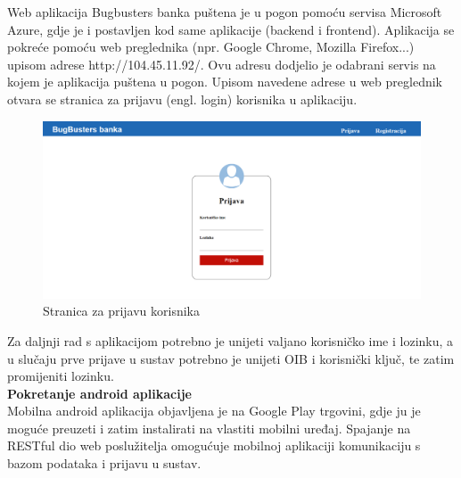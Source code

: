 			
			Web aplikacija Bugbusters banka puštena je u pogon pomoću servisa Microsoft Azure, gdje je i postavljen kod same aplikacije (backend i frontend). Aplikacija se pokreće pomoću web preglednika (npr. Google Chrome, Mozilla Firefox...) upisom adrese http://104.45.11.92/. Ovu adresu dodjelio je odabrani servis na kojem je aplikacija puštena u pogon. Upisom navedene adrese u web preglednik otvara se stranica za prijavu (engl. login) korisnika u aplikaciju. 
			
			\begin{figure}[H]
				\includegraphics[scale=0.3]{Slike/login.png}
				\centering
				\caption{Stranica za prijavu korisnika}
				\label{fig:dijagram}
			\end{figure}
			
			
			Za daljnji rad s aplikacijom potrebno je unijeti valjano korisničko ime i lozinku, a u slučaju prve prijave u sustav potrebno je unijeti OIB i korisnički ključ, te zatim promijeniti lozinku.
		\\	
			
		\textbf{Pokretanje android aplikacije}
		\\
		
		 Mobilna android aplikacija objavljena je na Google Play trgovini, gdje ju je moguće preuzeti i zatim instalirati na vlastiti mobilni uređaj. Spajanje na RESTful dio web poslužitelja omogućuje mobilnoj aplikaciji komunikaciju s bazom podataka i prijavu u sustav.